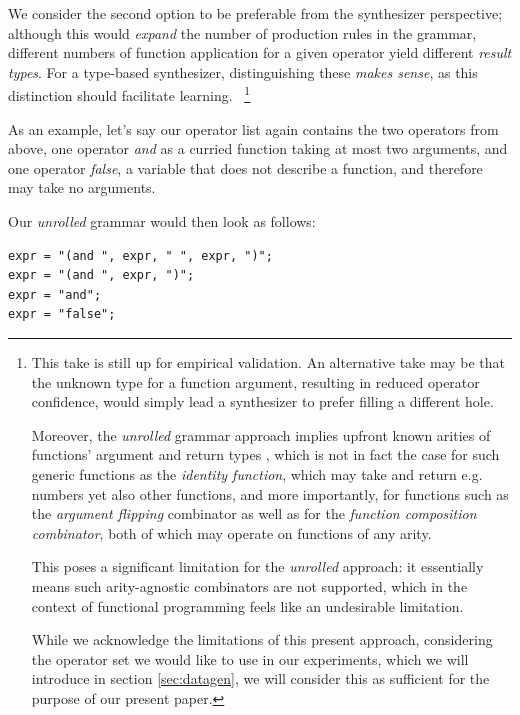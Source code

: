 \documentclass{article}
\begin{document}
We consider the second option to be preferable from the synthesizer perspective;
although this would \emph{expand} the number of production rules in the grammar,
different numbers of function application for a given operator yield different \emph{result types}.
For a type-based synthesizer, distinguishing these \emph{makes sense},
as this distinction should facilitate learning.%
~\footnote{
    This take is still up for empirical validation.
    An alternative take may be that the unknown type for a function argument,
    resulting in reduced operator confidence,
    would simply lead a synthesizer to prefer filling a different hole.

    Moreover, the \emph{unrolled} grammar approach implies upfront known arities of functions' argument and return types%
    ,
    which is not in fact the case for such generic functions as the \emph{identity function},
    which may take and return e.g. numbers yet also other functions,
    and more importantly, for functions such as the \emph{argument flipping} combinator
    as well as for the \emph{function composition combinator},
    both of which may operate on functions of any arity.

    This poses a significant limitation for the \emph{unrolled} approach:
    it essentially means such arity-agnostic combinators are not supported,
    which in the context of functional programming feels like an undesirable limitation.

    While we acknowledge the limitations of this present approach,
    considering the operator set we would like to use in our experiments,
    which we will introduce in section \ref{sec:datagen},
    we will consider this as sufficient for the purpose of our present paper.

}

As an example, let's say our operator list again contains the two operators from above,
one operator \emph{and} as a curried function taking at most two arguments,
and one operator \emph{false}, a variable that does not describe a function,
and therefore may take no arguments.

Our \emph{unrolled} grammar would then look as follows:
\begin{verbatim}
expr = "(and ", expr, " ", expr, ")";
expr = "(and ", expr, ")";
expr = "and";
expr = "false";
\end{verbatim}
\end{document}
